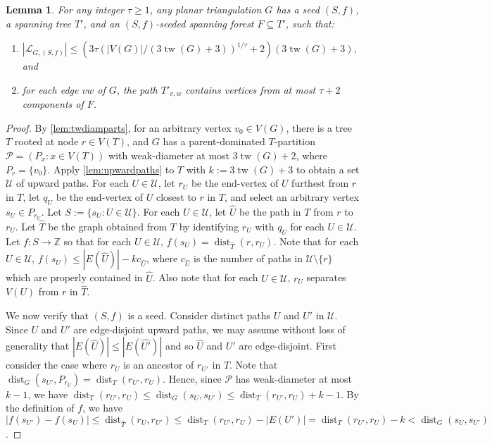 \documentclass[11pt]{article}
\renewcommand{\geq}{\geqslant}
\renewcommand{\leq}{\leqslant}
\DeclareMathOperator{\dist}{dist}
\DeclareMathOperator{\tw}{tw}
\theoremstyle{plain}
\newtheorem{lem}[thm]{Lemma}
\theoremstyle{definition}
\newcommand{\PP}{\mathcal{P}}
\begin{document}
		
		\begin{lem}
			\label{GenerateSeeds}
			For any integer $\tau\geq 1$, any planar triangulation $G$  has a seed $(S,f)$, a spanning tree $T'$, and an $(S,f)$-seeded spanning forest $F\subseteq T'$, such that:
			\begin{enumerate}
				\item $|\mathcal{L}_{G,(S,f)}|\leq (3\tau(|V(G)|/(3\tw(G)+3))^{1/\tau}+2)(3\tw(G)+3)$, and
				\item for each edge $vw$ of $G$, the path $T'_{v,w}$ contains vertices from at most $\tau+2$ components of $F$.
			\end{enumerate}
		\end{lem}
		
		\begin{proof}
			By \cref{lem:twdiamparts}, for an arbitrary vertex $v_0\in V(G)$, there is a tree $T$ rooted at node $r\in V(T)$, and $G$ has a parent-dominated $T$-partition $\PP=(P_x:x\in V(T))$ with weak-diameter at most $3\tw(G)+2$, where $P_r=\{v_0\}$. Apply \cref{lem:upwardpaths} to $T$ with $k:=3\tw(G)+3$ to obtain a set $\mathcal{U}$ of upward paths. For each $U\in \mathcal{U}$, let $r_U$ be the end-vertex of $U$ furthest from $r$ in $T$, let $q_U$ be the end-vertex of $U$ closest to $r$ in $T$, and select an arbitrary vertex $s_U\in P_{r_U}$. Let $S:=\{s_U:U\in \mathcal{U}\}$. For each $U\in \mathcal{U}$, let $\hat{U}$ be the path in $T$ from $r$ to $r_U$.
			Let $\hat{T}$ be the graph obtained from $T$ by identifying $r_U$ with $q_U$ for each $U\in \mathcal{U}$.
			Let $f:S\to \mathbb{Z}$ so that for each $U\in \mathcal{U}$, $f(s_U)=\dist_{\hat{T}}(r,r_U)$.
			Note that for each $U\in \mathcal{U}$, $f(s_U)\leq |E(\hat{U})|-kc_{\hat{U}}$, where $c_{\hat{U}}$ is the number of paths in $\mathcal{U}\setminus \{r\}$ which are properly contained in $\hat{U}$.
			Also note that for each $U\in \mathcal{U}$, $r_U$ separates $V(U)$ from $r$ in $\hat{T}$.
			
			
			
			We now verify that $(S,f)$ is a seed.
			Consider distinct paths $U$ and $U'$ in $\mathcal{U}$. 
			Since $U$ and $U'$ are edge-disjoint upward paths, we may assume without loss of generality that $|E(\hat{U})|\leq |E(\hat{U'})|$ and so $\hat{U}$ and $U'$ are edge-disjoint.
			First consider the case where $r_U$ is an ancestor of $r_{U'}$ in $T$. 
			Note that $\dist_{G}(s_{U'},P_{r_U})=\dist_T(r_{U'},r_U)$. Hence, since $\PP$ has weak-diameter at most $k-1$, we have $\dist_T(r_{U'},r_U)\leq \dist_G(s_U,s_{U'})\leq \dist_T(r_{U'},r_U)+k-1$.
			By the definition of $f$, we have $|f(s_{U'})-f(s_U)|\leq\dist_{\hat{T}}(r_U,r_{U'})\leq \dist_T(r_{U'},r_U)-|E(U')|=\dist_T(r_{U'},r_U)-k<\dist_{G}(s_U,s_{U'})$.
			

\end{proof}
\end{document}
